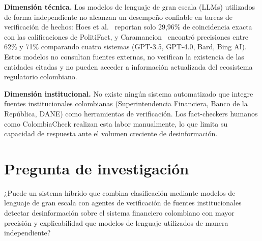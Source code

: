 \textbf{Dimensión técnica.} Los modelos de lenguaje de gran escala (LLMs) utilizados de forma independiente no alcanzan un desempeño confiable en tareas de verificación de hechos: Hoes et al.~\cite{Hoes2023} reportan solo 29,96\% de coincidencia exacta con las calificaciones de PolitiFact, y Caramancion~\cite{Caramancion2023} encontró precisiones entre 62\% y 71\% comparando cuatro sistemas (GPT-3.5, GPT-4.0, Bard, Bing AI). Estos modelos no consultan fuentes externas, no verifican la existencia de las entidades citadas y no pueden acceder a información actualizada del ecosistema regulatorio colombiano.

\textbf{Dimensión institucional.} No existe ningún sistema automatizado que integre fuentes institucionales colombianas (Superintendencia Financiera, Banco de la República, DANE) como herramientas de verificación. Los fact-checkers humanos como ColombiaCheck realizan esta labor manualmente, lo que limita su capacidad de respuesta ante el volumen creciente de desinformación.

\section{Pregunta de investigación}

¿Puede un sistema híbrido que combina clasificación mediante modelos de lenguaje de gran escala con agentes de verificación de fuentes institucionales detectar desinformación sobre el sistema financiero colombiano con mayor precisión y explicabilidad que modelos de lenguaje utilizados de manera independiente?
